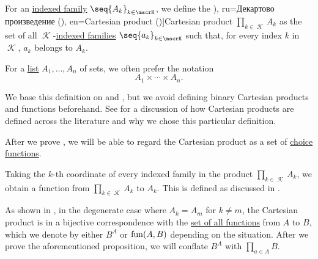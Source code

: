 \begin{definition}\label{def:cartesian_product}\mimprovised
  For an \hyperref[def:indexed_family]{indexed family} \( \seq{ A_k }_{k \in \mscrK} \), we define the \term[bg=Декартово произведение (\cite[367]{ГеновМиховскиМоллов1991Алгебра}), ru=Декартово произведение (\cite[11]{Архангельский1988КанторовскаяТеорияМножеств}), en=Cartesian product (\cite[36]{Halmos1960NaiveSetTheory})]{Cartesian product} \( \prod_{k \in \mscrK} A_k \) as the set of all \( \mscrK \)-\hyperref[def:indexed_family]{indexed families} \( \seq{ a_k }_{k \in \mscrK} \) such that, for every index \( k \) in \( \mscrK \), \( a_k \) belongs to \( A_k \).

  For a \hyperref[def:ordered_tuple]{list} \( A_1, \ldots, A_n \) of sets, we often prefer the notation
  \begin{equation*}
    A_1 \times \cdots \times A_n.
  \end{equation*}
\end{definition}
\begin{comments}
  \item We base this definition on \cite[36]{Halmos1960NaiveSetTheory} and \cite[11]{Архангельский1988КанторовскаяТеорияМножеств}, but we avoid defining binary Cartesian products and functions beforehand. See  for a discussion of how Cartesian products are defined across the literature and why we chose this particular definition.

  \item After we prove , we will be able to regard the Cartesian product as a set of \hyperref[def:choice_function]{choice functions}.

  \item Taking the \( k \)-th coordinate of every indexed family in the product \( \prod_{k \in \mscrK} A_k \), we obtain a function from \( \prod_{k \in \mscrK} A_k \) to \( A_k \). This is defined as discussed in .

  \item As shown in , in the degenerate case where \( A_k = A_m \) for \( k \neq m \), the Cartesian product is in a bijective correspondence with the \hyperref[def:set_of_all_functions]{set of all functions} from \( A \) to \( B \), which we denote by either \( B^A \) or \( \operatorname{fun}(A, B) \) depending on the situation. After we prove the aforementioned proposition, we will conflate \( B^A \) with \( \prod_{a \in A} B \).
\end{comments}

